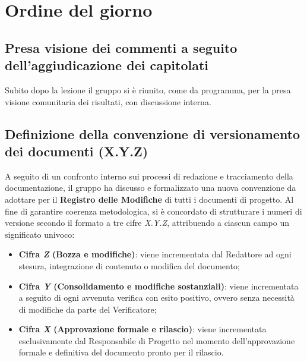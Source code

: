 \newpage
\vspace{0.8cm}

\section{Ordine del giorno}
\subsection{Presa visione dei commenti a seguito dell'aggiudicazione dei capitolati}
Subito dopo la lezione il gruppo si è riunito, come da programma, per la presa visione comunitaria dei risultati, con discussione interna.

\subsection{Definizione della convenzione di versionamento dei documenti (X.Y.Z)}
A seguito di un confronto interno sui processi di redazione e tracciamento della documentazione, il gruppo ha discusso e formalizzato una nuova convenzione da adottare per il \textbf{Registro delle Modifiche} di tutti i documenti di progetto. Al fine di garantire coerenza metodologica, si è concordato di strutturare i numeri di versione secondo il formato a tre cifre \textit{X.Y.Z}, attribuendo a ciascun campo un significato univoco:

\begin{itemize}
    \item \textbf{Cifra \textit{Z} (Bozza e modifiche)}: viene incrementata dal Redattore ad ogni stesura, integrazione di contenuto o modifica del documento;
    \item \textbf{Cifra \textit{Y} (Consolidamento e modifiche sostanziali)}: viene incrementata a seguito di ogni avvenuta verifica con esito positivo, ovvero senza necessità di modifiche da parte del Verificatore;
    \item \textbf{Cifra \textit{X} (Approvazione formale e rilascio)}: viene incrementata esclusivamente dal Responsabile di Progetto nel momento dell'approvazione formale e definitiva del documento pronto per il rilascio.
\end{itemize}

